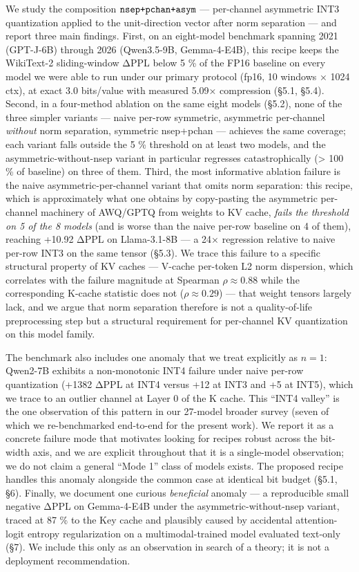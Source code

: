 \documentclass[
]{article}
\newcounter{none} %
\begin{document}
We study the composition \(\text{\tt nsep+pchan+asym}\) --- per-channel
asymmetric INT3 quantization applied to the unit-direction vector after
norm separation --- and report three main findings. First, on an
eight-model benchmark spanning 2021 (GPT-J-6B) through 2026 (Qwen3.5-9B,
Gemma-4-E4B), this recipe keeps the WikiText-2 sliding-window ΔPPL below
5 \% of the FP16 baseline on every model we were able to run under our
primary protocol (fp16, 10 windows × 1024 ctx), at exact 3.0 bits/value
with measured 5.09× compression (§5.1, §5.4). Second, in a four-method
ablation on the same eight models (§5.2), none of the three simpler
variants --- naive per-row symmetric, asymmetric per-channel
\emph{without} norm separation, symmetric nsep+pchan --- achieves the
same coverage; each variant falls outside the 5 \% threshold on at least
two models, and the asymmetric-without-nsep variant in particular
regresses catastrophically (\textgreater{} 100 \% of baseline) on three
of them. Third, the most informative ablation failure is the naive
asymmetric-per-channel variant that omits norm separation: this recipe,
which is approximately what one obtains by copy-pasting the asymmetric
per-channel machinery of AWQ/GPTQ from weights to KV cache, \emph{fails
the threshold on 5 of the 8 models} (and is worse than the naive per-row
baseline on 4 of them), reaching +10.92 ΔPPL on Llama-3.1-8B --- a 24×
regression relative to naive per-row INT3 on the same tensor (§5.3). We
trace this failure to a specific structural property of KV caches ---
V-cache per-token L2 norm dispersion, which correlates with the failure
magnitude at Spearman \(\rho \approx 0.88\) while the corresponding
K-cache statistic does not (\(\rho \approx 0.29\)) --- that weight
tensors largely lack, and we argue that norm separation therefore is not
a quality-of-life preprocessing step but a structural requirement for
per-channel KV quantization on this model family.

The benchmark also includes one anomaly that we treat explicitly as
\(n = 1\): Qwen2-7B exhibits a non-monotonic INT4 failure under naive
per-row quantization (+1382 ΔPPL at INT4 versus +12 at INT3 and +5 at
INT5), which we trace to an outlier channel at Layer 0 of the K cache.
This ``INT4 valley'' is the one observation of this pattern in our
27-model broader survey (seven of which we re-benchmarked end-to-end for
the present work). We report it as a concrete failure mode that
motivates looking for recipes robust across the bit-width axis, and we
are explicit throughout that it is a single-model observation; we do not
claim a general ``Mode 1'' class of models exists. The proposed recipe
handles this anomaly alongside the common case at identical bit budget
(§5.1, §6). Finally, we document one curious \emph{beneficial} anomaly
--- a reproducible small negative ΔPPL on Gemma-4-E4B under the
asymmetric-without-nsep variant, traced at 87 \% to the Key cache and
plausibly caused by accidental attention-logit entropy regularization on
a multimodal-trained model evaluated text-only (§7). We include this
only as an observation in search of a theory; it is not a deployment
recommendation.
\end{document}
